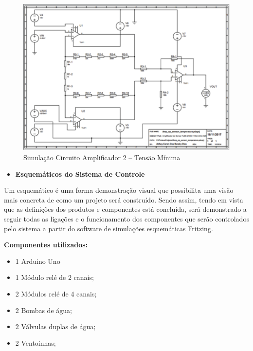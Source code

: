 \begin{figure}[!htb]                  
	\centering                          
	\includegraphics[scale=0.45]{figuras/circ3.eps}
	\caption{ Simulação Circuito Amplificador 2 – Tensão Mínima }   \label{figamp22}              
\end{figure}


\begin{itemize}
    \item \textbf{Esquemáticos do Sistema de Controle}
\end{itemize}
Um esquemático é uma forma demonstração visual que possibilita uma visão mais concreta de como um projeto será construído. Sendo assim, tendo em vista que as definições dos produtos e componentes está concluída, será demonstrado a seguir todas as ligações e o funcionamento dos componentes que serão controlados pelo sistema a partir do software de simulações esquemáticas Fritzing.

\textbf{Componentes utilizados:}
\begin{itemize}
    \item 1 Arduino Uno
    \item 1 Módulo relé de 2 canais;
    \item 2 Módulos relé de 4 canais;
    \item 2 Bombas de água;
    \item 2 Válvulas duplas de água;
    \item 2 Ventoinhas;
    
\end{itemize}

